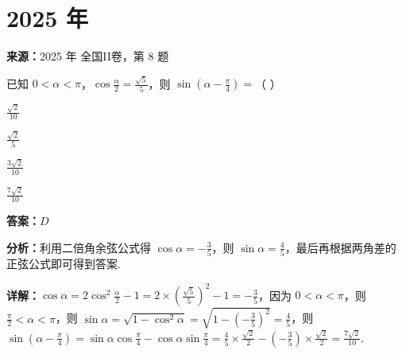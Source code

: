 \section*{2025 年}

\begin{question}[points=5]
\textbf{来源：}2025 年 全国II卷，第 8 题\par
已知 $0<\alpha<\pi$，$\cos\frac{\alpha}{2}=\frac{\sqrt{5}}{5}$，则 $\sin\left(\alpha-\frac{\pi}{4}\right)=$（ ）
\begin{choices}
  \item $\frac{\sqrt{2}}{10}$
  \item $\frac{\sqrt{2}}{5}$
  \item $\frac{3\sqrt{2}}{10}$
  \item $\frac{7\sqrt{2}}{10}$
\end{choices}
\begin{solution}
\textbf{答案：}$D$

\textbf{分析：}利用二倍角余弦公式得 $\cos\alpha=-\frac{3}{5}$，则 $\sin\alpha=\frac{4}{5}$，最后再根据两角差的正弦公式即可得到答案.

\textbf{详解：}$\cos\alpha=2\cos^2\frac{\alpha}{2}-1=2\times\left(\frac{\sqrt{5}}{5}\right)^2-1=-\frac{3}{5}$，因为 $0<\alpha<\pi$，则 $\frac{\pi}{2}<\alpha<\pi$，则 $\sin\alpha=\sqrt{1-\cos^2\alpha}=\sqrt{1-\left(-\frac{3}{5}\right)^2}=\frac{4}{5}$，则 $\sin\left(\alpha-\frac{\pi}{4}\right)=\sin\alpha\cos\frac{\pi}{4}-\cos\alpha\sin\frac{\pi}{4}=\frac{4}{5}\times\frac{\sqrt{2}}{2}-\left(-\frac{3}{5}\right)\times\frac{\sqrt{2}}{2}=\frac{7\sqrt{2}}{10}$.
\end{solution}
\end{question}


